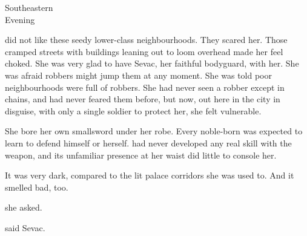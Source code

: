 \begin{comment}
\subsection{Tiroco and the Crazy Old Woman}
\end{comment}
\stamp
  {\dateTirocoAndTheCrazyOldWoman}
  {Southeastern \\
   Evening}

\Tiroco{} did not like these seedy lower-class neighbourhoods. 
They scared her. 
Those cramped streets with buildings leaning out to loom overhead made her feel choked. 
She was very glad to have Sevac, her faithful bodyguard, with her. 
She was afraid robbers might jump them at any moment. 
She was told poor neighbourhoods were full of robbers. 
She had never seen a robber except in chains, and had never feared them before, but now, out here in the city in disguise, with only a single soldier to protect her, she felt vulnerable. 

She bore her own smallsword under her robe. 
Every noble-born \scatha{} was expected to learn to defend himself or herself. 
\Tiroco{} had never developed any real skill with the weapon, and its unfamiliar presence at her waist did little to console her. 

It was very dark, compared to the lit palace corridors she was used to. 
And it smelled bad, too. 


 she asked. 

 said Sevac. 

